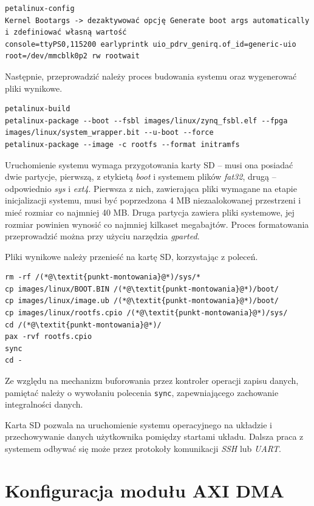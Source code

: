 \begin{lstlisting}[breaklines=true]
petalinux-config
Kernel Bootargs -> dezaktywować opcję Generate boot args automatically i zdefiniować własną wartość
console=ttyPS0,115200 earlyprintk uio_pdrv_genirq.of_id=generic-uio root=/dev/mmcblk0p2 rw rootwait 
\end{lstlisting}
Następnie, przeprowadzić należy proces budowania systemu oraz wygenerować pliki wynikowe.

\begin{lstlisting}[breaklines=true]
petalinux-build
petalinux-package --boot --fsbl images/linux/zynq_fsbl.elf --fpga images/linux/system_wrapper.bit --u-boot --force
petalinux-package --image -c rootfs --format initramfs
\end{lstlisting}

Uruchomienie systemu wymaga przygotowania karty SD -- musi ona posiadać dwie partycje, pierwszą, z etykietą \emph{boot} i systemem plików \emph{fat32}, drugą -- odpowiednio \emph{sys} i \emph{ext4}. Pierwsza z nich, zawierająca pliki wymagane na etapie inicjalizacji systemu, musi być poprzedzona 4 MB niezaalokowanej przestrzeni i mieć rozmiar co najmniej 40 MB. Druga partycja zawiera pliki systemowe, jej rozmiar powinien wynosić co najmniej kilkaset megabajtów. Proces formatowania przeprowadzić można przy użyciu narzędzia \emph{gparted}.

Pliki wynikowe należy przenieść na kartę SD, korzystając z poleceń.

\begin{lstlisting}[breaklines=true]
rm -rf /(*@\textit{punkt-montowania}@*)/sys/*
cp images/linux/BOOT.BIN /(*@\textit{punkt-montowania}@*)/boot/
cp images/linux/image.ub /(*@\textit{punkt-montowania}@*)/boot/
cp images/linux/rootfs.cpio /(*@\textit{punkt-montowania}@*)/sys/
cd /(*@\textit{punkt-montowania}@*)/
pax -rvf rootfs.cpio
sync
cd -
\end{lstlisting}

Ze względu na mechanizm buforowania przez kontroler operacji zapisu danych, pamiętać należy o wywołaniu polecenia \texttt{sync}, zapewniającego zachowanie integralności danych.

Karta SD pozwala na uruchomienie systemu operacyjnego na układzie i przechowywanie danych użytkownika pomiędzy startami układu. Dalsza praca z systemem odbywać się może przez protokoły komunikacji \emph{SSH} lub \emph{UART}.

\section{Konfiguracja modułu AXI DMA}
\label{sec:vivado-axi-dma}

